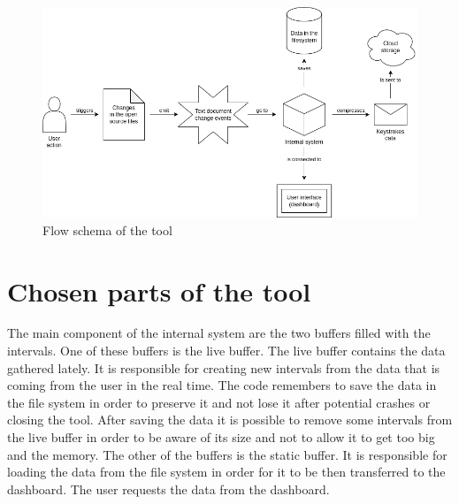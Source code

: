 \begin{figure}[h]
  \centering
  \includegraphics[scale=0.5]{chapters/coding_process_tracker.png}
  \caption{Flow schema of the tool}
\end{figure}

\section{Chosen parts of the tool}

The main component of the internal system are the two buffers filled with the intervals. One of these buffers is the live buffer. The live buffer contains the data gathered lately. It is responsible for creating new intervals from the data that is coming from the user in the real time. The code remembers to save the data in the file system in order to preserve it and not lose it after potential crashes or closing the tool. After saving the data it is possible to remove some intervals from the live buffer in order to be aware of its size and not to allow it to get too big and the memory. The other of the buffers is the static buffer. It is responsible for loading the data from the file system in order for it to be then transferred to the dashboard. The user requests the data from the dashboard.

